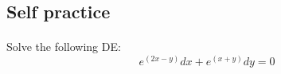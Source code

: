 \subsection{Self practice}
\begin{frame}{
    \insertsectionhead}
    \framesubtitle{\insertsubsectionhead}
    Solve the following DE:
        \begin{equation*} \tag{16}
            e^{(2x-y)}dx + e^{(x+y)}dy = 0
        \end{equation*}
        \newline\newline\newline\newline\newline\newline
\end{frame}
